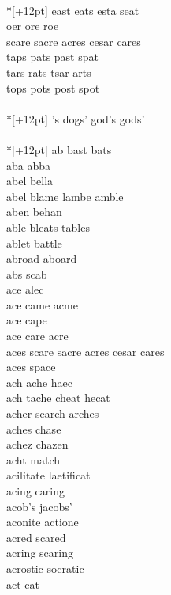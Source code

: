 
\vspace{14pt}
\noindent\notextbf{\Large }\\*[+12pt]
 east eats esta seat    \\
 oer ore roe   \\
 scare sacre acres cesar cares     \\
 taps pats past spat    \\
 tars rats tsar arts    \\
 tops pots post spot    \\

\vspace{14pt}
\noindent{}\\*[+12pt]
's dogs' god's gods'   \\

\vspace{14pt}
\noindent\notextbf{\LargeA}\\*[+12pt]
ab bast bats  \\
aba abba \\
abel bella \\
abel blame lambe amble \\
aben behan \\
able bleats tables  \\
ablet battle \\
abroad aboard\\
abs scab \\
ace alec \\
ace came acme \\
ace cape \\
ace care acre \\
aces scare sacre acres cesar cares \\
aces space \\
ach ache haec \\
ach tache cheat hecat  \\
acher search arches \\
aches chase\\
achez chazen \\
acht match \\
acilitate laetificat \\
acing caring \\
acob's jacobs' \\
aconite actione\\
acred scared \\
acring scaring \\
acrostic socratic\\
act cat\\
